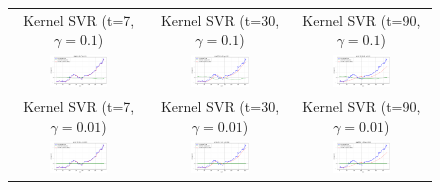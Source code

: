 \documentclass{article}
\begin{document}
\begin{figure}[h]
\begin{tabular}{ccc}
        \small Kernel SVR (t=7, $\gamma=0.1$) & \small Kernel SVR (t=30, $\gamma=0.1$) & \small Kernel SVR (t=90, $\gamma=0.1$) \\

        \includegraphics[width=0.45\textwidth]{kernel7_100.png} &  
        \includegraphics[width=0.45\textwidth]{kernel30_100.png} &  
        \includegraphics[width=0.45\textwidth]{kernel90_100.png} \\

        \small Kernel SVR (t=7, $\gamma=0.01$) & \small Kernel SVR (t=30, $\gamma=0.01$) & \small Kernel SVR (t=90, $\gamma=0.01$) \\

        \includegraphics[width=0.45\textwidth]{kernel7_1000.png} &  
        \includegraphics[width=0.45\textwidth]{kernel30_1000.png} &  
        \includegraphics[width=0.45\textwidth]{kernel90_1000.png} \\


\end{tabular}
\end{figure}
\end{document}
